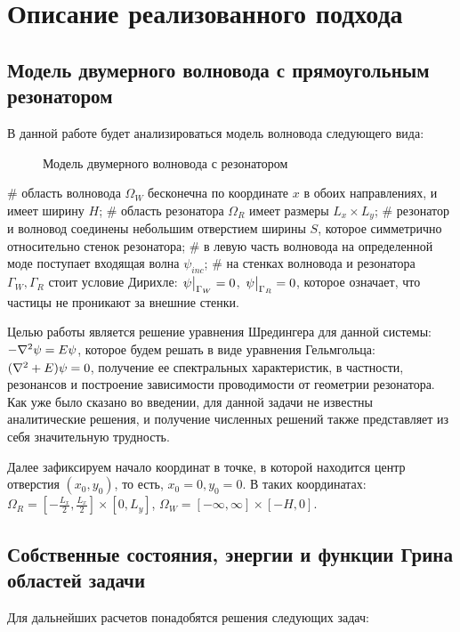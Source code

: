 \chapter{Описание реализованного подхода}
\label{chapter2}

\section{Модель двумерного волновода с прямоугольным резонатором}
В данной работе будет анализироваться модель волновода следующего вида:
\begin{figure}[h!]
\begin{tikzpicture}[scale=0.7]

\end{tikzpicture}
\caption{Модель двумерного волновода с резонатором}
\end{figure}

\begin{ilist}
# область волновода $\Omega_W$ бесконечна по координате $x$ в обоих направлениях, и имеет ширину $H$;
# область резонатора $\Omega_R$ имеет размеры $L_x \times L_y$;
# резонатор и волновод соединены небольшим отверстием ширины $S$, которое симметрично относительно стенок резонатора;
# в левую часть волновода на определенной моде поступает входящая волна $\psi_{inc}$;
# на стенках волновода и резонатора $\Gamma_W, \Gamma_R$ стоит условие Дирихле: $\eval{\psi}_{\Gamma_W} = 0$, $\eval{\psi}_{\Gamma_R} = 0$, которое означает, что частицы не проникают за внешние стенки.
\end{ilist}

Целью работы является решение уравнения Шредингера для данной системы: $-\laplacian \psi = E \psi$, которое будем решать в виде уравнения Гельмгольца: $(\laplacian + E) \psi = 0$, получение ее спектральных характеристик, в частности, резонансов и построение зависимости проводимости от геометрии резонатора. Как уже было сказано во введении, для данной задачи не известны аналитические решения, и получение численных решений также представляет из себя значительную трудность.

Далее зафиксируем начало координат в точке, в которой находится центр отверстия $(x_0, y_0)$, то есть, $x_0 = 0, y_0 = 0$. В таких координатах: $\Omega_R = [- \frac{L_x}{2}, \frac{L_x}{2}] \times [0, L_y]$, $\Omega_W = [-\infty, \infty] \times [-H, 0]$.

\section{Собственные состояния, энергии и функции Грина областей задачи}
Для дальнейших расчетов понадобятся решения следующих задач:

